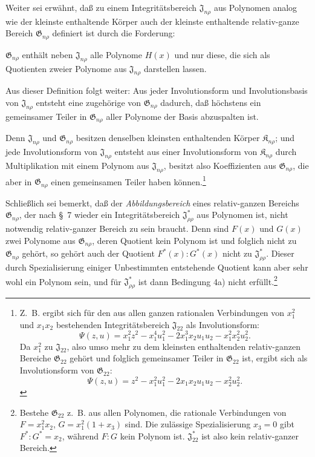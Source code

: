 \documentclass[11pt]{article}
\providecommand{\Kfield}{\mathfrak{K}}
\providecommand{\Jdom}{\mathfrak{J}}
\providecommand{\Gdom}{\mathfrak{G}}
\begin{document}
Weiter sei erwähnt, daß zu einem Integritätsbereich $\Jdom_{n\rho}$ aus Polynomen analog wie der kleinste enthaltende Körper auch der kleinste enthaltende relativ-ganze Bereich $\Gdom_{n\rho}$ definiert ist durch die Forderung:

$\Gdom_{n\rho}$ enthält neben $\Jdom_{n\rho}$ alle Polynome $H(x)$ und nur diese, die sich als Quotienten zweier Polynome aus $\Jdom_{n\rho}$ darstellen lassen.

Aus dieser Definition folgt weiter: Aus jeder Involutionsform und Involutionsbasis von $\Jdom_{n\rho}$ entsteht eine zugehörige von $\Gdom_{n\rho}$ dadurch, daß höchstens ein gemeinsamer Teiler in $\Gdom_{n\rho}$ aller Polynome der Basis abzuspalten ist.

Denn $\Jdom_{n\rho}$ und $\Gdom_{n\rho}$ besitzen denselben kleinsten enthaltenden Körper $\Kfield_{n\rho}$; und jede Involutionsform von $\Jdom_{n\rho}$ entsteht aus einer Involutionsform von $\Kfield_{n\rho}$ durch Multiplikation mit einem Polynom aus $\Jdom_{n\rho}$, besitzt also Koeffizienten aus $\Gdom_{n\rho}$, die aber in $\Gdom_{n\rho}$ einen gemeinsamen Teiler haben können.\footnote{Z.~B. ergibt sich für den aus allen ganzen rationalen Verbindungen von $x_1^2$ und $x_1x_2$ bestehenden Integritätsbereich $\Jdom_{22}$ als Involutionsform:
\[
\Psi(z,u)=x_1^2z^2-x_1^4u_1^2-2x_1^3x_2u_1u_2-x_1^2x_2^2u_2^2.
\]
Da $x_1^2$ zu $\Jdom_{22}$, also umso mehr zu dem kleinsten enthaltenden relativ-ganzen Bereiche $\Gdom_{22}$ gehört und folglich gemeinsamer Teiler in $\Gdom_{22}$ ist, ergibt sich als Involutionsform von $\Gdom_{22}$:
\[
\Psi(z,u)=z^2-x_1^2u_1^2-2x_1x_2u_1u_2-x_2^2u_2^2.
\]}

Schließlich sei bemerkt, daß der \emph{Abbildungsbereich} eines relativ-ganzen Bereichs $\Gdom_{n\rho}$, der nach \S\ 7 wieder ein Integritätsbereich $\Jdom^*_{\rho\rho}$ aus Polynomen ist, nicht notwendig relativ-ganzer Bereich zu sein braucht. Denn sind $F(x)$ und $G(x)$ zwei Polynome aus $\Gdom_{n\rho}$, deren Quotient kein Polynom ist und folglich nicht zu $\Gdom_{n\rho}$ gehört, so gehört auch der Quotient $F^*(x):G^*(x)$ nicht zu $\Jdom^*_{\rho\rho}$. Dieser durch Spezialisierung einiger Unbestimmten entstehende Quotient kann aber sehr wohl ein Polynom sein, und für $\Jdom^*_{\rho\rho}$ ist dann Bedingung 4a) nicht erfüllt.\footnote{Bestehe $\Gdom_{22}$ z.~B. aus allen Polynomen, die rationale Verbindungen von $F=x_1^2x_2$, $G=x_1^2(1+x_3)$ sind. Die zulässige Spezialisierung $x_3=0$ gibt $F^*:G^*=x_2$, während $F:G$ kein Polynom ist. $\Jdom^*_{22}$ ist also kein relativ-ganzer Bereich.}
\end{document}
